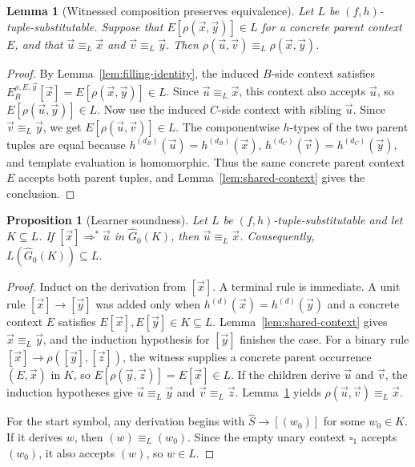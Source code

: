 \documentclass[11pt,a4paper]{article}
\newtheorem{lemma}[theorem]{Lemma}
\newtheorem{proposition}[theorem]{Proposition}
\theoremstyle{remark}
\newcommand{\tuple}[1]{\vec{#1}}
\newcommand{\blank}{\square}
\begin{document}
\begin{lemma}[Witnessed composition preserves equivalence]
\label{lem:witnessed-composition}
Let \(L\) be \((f,h)\)-tuple-substitutable.  Suppose that
\(E[\rho(\tuple x,\tuple y)]\in L\) for a concrete parent context \(E\), and
that \(\tuple u\equiv_L\tuple x\) and \(\tuple v\equiv_L\tuple y\).  Then
\(\rho(\tuple u,\tuple v)\equiv_L\rho(\tuple x,\tuple y)\).
\end{lemma}

\begin{proof}
By Lemma~\ref{lem:filling-identity}, the induced \(B\)-side context satisfies
\(E_B^{\rho,E,\tuple y}[\tuple x]=E[\rho(\tuple x,\tuple y)]\in L\).  Since
\(\tuple u\equiv_L\tuple x\), this context also accepts \(\tuple u\), so
\(E[\rho(\tuple u,\tuple y)]\in L\).  Now use the induced \(C\)-side context
with sibling \(\tuple u\).  Since \(\tuple v\equiv_L\tuple y\), we get
\(E[\rho(\tuple u,\tuple v)]\in L\).  The componentwise \(h\)-types of the two
parent tuples are equal because \(h^{(d_B)}(\tuple u)=h^{(d_B)}(\tuple x)\),
\(h^{(d_C)}(\tuple v)=h^{(d_C)}(\tuple y)\), and template evaluation is
homomorphic.  Thus the same concrete parent context \(E\) accepts both parent
tuples, and Lemma~\ref{lem:shared-context} gives the conclusion.
\end{proof}

\begin{proposition}[Learner soundness]
\label{prop:learner-soundness}
Let \(L\) be \((f,h)\)-tuple-substitutable and let \(K\subseteq L\).  If
\([\tuple x]\Rightarrow^*\tuple u\) in \(\widehat G_0(K)\), then
\(\tuple u\equiv_L\tuple x\).  Consequently, \(L(\widehat G_0(K))\subseteq L\).
\end{proposition}

\begin{proof}
Induct on the derivation from \([\tuple x]\).  A terminal rule is immediate.  A
unit rule \([\tuple x]\to[\tuple y]\) was added only when \(h^{(d)}(\tuple x)=
h^{(d)}(\tuple y)\) and a concrete context \(E\) satisfies
\(E[\tuple x],E[\tuple y]\in K\subseteq L\).  Lemma~\ref{lem:shared-context}
gives \(\tuple x\equiv_L\tuple y\), and the induction hypothesis for
\([\tuple y]\) finishes the case.  For a binary rule
\([\tuple x]\to\rho([\tuple y],[\tuple z])\), the witness supplies a concrete
parent occurrence \((E,\tuple x)\) in \(K\), so \(E[\rho(\tuple y,\tuple z)]
=E[\tuple x]\in L\).  If the children derive \(\tuple u\) and \(\tuple v\), the
induction hypotheses give \(\tuple u\equiv_L\tuple y\) and
\(\tuple v\equiv_L\tuple z\).  Lemma~\ref{lem:witnessed-composition} yields
\(\rho(\tuple u,\tuple v)\equiv_L\tuple x\).

For the start symbol, any derivation begins with \(\widehat S\to[(w_0)]\) for
some \(w_0\in K\).  If it derives \(w\), then \((w)\equiv_L(w_0)\).  Since the
empty unary context \(\blank_1\) accepts \((w_0)\), it also accepts \((w)\), so
\(w\in L\).
\end{proof}
\end{document}
